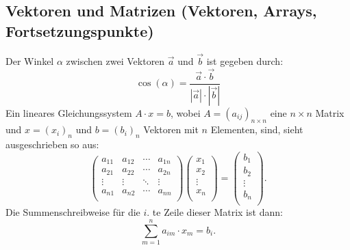 \documentclass[a4paper,11pt]{article}
\begin{document}
\subsection{Vektoren und Matrizen (Vektoren, Arrays, Fortsetzungspunkte)}
Der Winkel $\alpha$ zwischen zwei Vektoren $\vec{a}$ und $\vec{b}$ ist gegeben durch:
\[
\cos(\alpha)=\frac{\vec{a}\cdot\vec{b}}{|\vec{a}|\cdot|\vec{b}|}
\]
Ein lineares Gleichungssystem $A\cdot x=b$, wobei $A=(a_{ij})_{n\times n}$ eine $n\times n$ Matrix und
$x=(x_i)_n$ und $b=(b_i)_n$ Vektoren mit $n$ Elementen, sind, sieht ausgeschrieben so aus:
\[
\left(\begin{array}{cccc}
a_{11} & a_{12} & \cdots & a_{1n} \\
a_{21} & a_{22} & \cdots & a_{2n} \\
\vdots & \vdots & \ddots & \vdots \\
a_{n1} & a_{n2} & \cdots & a_{nn} \\
\end{array}\right) 
\left(\begin{array}{c}
x_{1} \\
x_{2} \\
\vdots \\
x_{n} \\
\end{array}\right) =
\left(\begin{array}{c}
b_{1} \\
b_{2} \\
\vdots \\
b_{n} \\
\end{array}\right).
\]
Die Summenschreibweise f\"ur die $i$. te Zeile dieser Matrix ist dann:
\[
\sum_{m=1}^{n} a_{im}\cdot x_{m} = b_i.
\]
\end{document}

